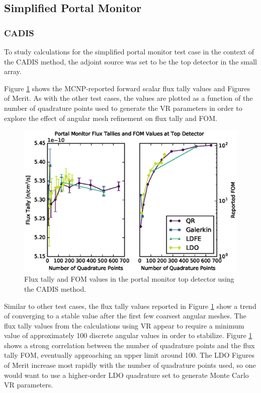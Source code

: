 \documentclass{article} %
\begin{document}
\subsection{Simplified Portal Monitor}

\subsubsection{CADIS}

To study calculations for the simplified portal monitor test case in the
context of the CADIS method, the adjoint source was set to be the top detector
in the small array.

Figure \ref{cargo-cadis} shows the MCNP-reported forward scalar flux tally
values and Figures of Merit. As with the other test cases, the values are
plotted as a function of the number of quadrature points used to generate the
VR parameters in order to explore the effect of angular mesh refinement on
flux tally and FOM.

\begin{figure}[!htb]
\centering
\includegraphics[max height=0.445\textheight]{portal-cadis.eps}
\caption{Flux tally and FOM values in the portal monitor top detector using
         the CADIS method.}
\label{cargo-cadis}
\end{figure}

Similar to other test cases, the flux tally values reported in Figure 
\ref{cargo-cadis} show a trend of converging to a stable value after the
first few coarsest angular meshes. The flux tally values from the
calculations using VR appear to require a minimum value of approximately 100
discrete angular values in order to stabilize. Figure \ref{cargo-cadis}
shows a strong correlation between the number of quadrature points and the
flux tally FOM, eventually approaching an upper limit around 100. The LDO
Figures of Merit increase most rapidly with the number of quadrature points
used, so one would want to use a higher-order LDO quadrature set to generate
Monte Carlo VR parameters.
\end{document}
